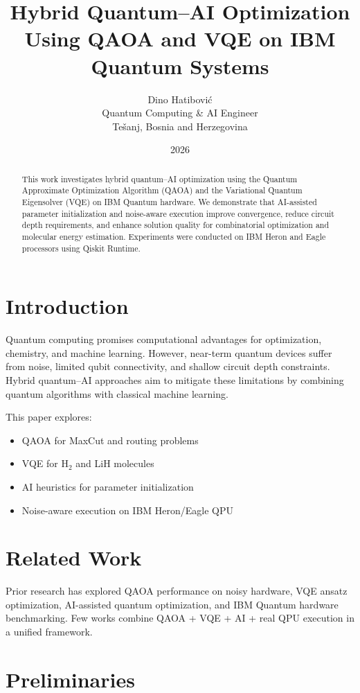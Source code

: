 \documentclass[12pt]{article}
\title{Hybrid Quantum--AI Optimization Using QAOA and VQE on IBM Quantum Systems}
\author{Dino Hatibović \\ Quantum Computing \& AI Engineer \\ Tešanj, Bosnia and Herzegovina}
\date{2026}
\begin{document}
\maketitle

\begin{abstract}
This work investigates hybrid quantum--AI optimization using the Quantum Approximate Optimization Algorithm (QAOA) and the Variational Quantum Eigensolver (VQE) on IBM Quantum hardware. We demonstrate that AI-assisted parameter initialization and noise-aware execution improve convergence, reduce circuit depth requirements, and enhance solution quality for combinatorial optimization and molecular energy estimation. Experiments were conducted on IBM Heron and Eagle processors using Qiskit Runtime.
\end{abstract}

\section{Introduction}
Quantum computing promises computational advantages for optimization, chemistry, and machine learning. However, near-term quantum devices suffer from noise, limited qubit connectivity, and shallow circuit depth constraints. Hybrid quantum--AI approaches aim to mitigate these limitations by combining quantum algorithms with classical machine learning.

This paper explores:
\begin{itemize}
    \item QAOA for MaxCut and routing problems
    \item VQE for H$_2$ and LiH molecules
    \item AI heuristics for parameter initialization
    \item Noise-aware execution on IBM Heron/Eagle QPU
\end{itemize}

\section{Related Work}
Prior research has explored QAOA performance on noisy hardware, VQE ansatz optimization, AI-assisted quantum optimization, and IBM Quantum hardware benchmarking. Few works combine QAOA + VQE + AI + real QPU execution in a unified framework.

\section{Preliminaries}
\end{document}

